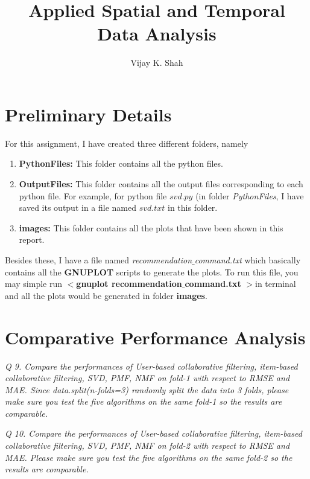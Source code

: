 \documentclass[journal,onecolumn]{IEEEtran}
\title{Applied Spatial and Temporal Data Analysis}
\author{Vijay K. Shah}
\begin{document}
\maketitle

\section{Preliminary Details}
For this assignment, I have created three different folders, namely \\
\begin{enumerate}
\item \textbf{PythonFiles:} This folder contains all the python files. \\
\item \textbf{OutputFiles:} This folder contains all the output files corresponding to each python file. For example, for python file $svd.py$ (in folder \textit{PythonFiles}, I have saved its output in  a file named $svd.txt$ in this folder. \\
\item \textbf{images:} This folder contains all the plots that have been shown in this report. \\
\end{enumerate}

Besides these, I have a file named \textit{recommendation$\_$command.txt} which basically contains all the \textbf{GNUPLOT} scripts to generate the plots. To run this file, you may simple run $<$\textbf{gnuplot recommendation$\_$command.txt} $>$in terminal and all the plots would be generated in folder \textbf{images}.


\section{Comparative Performance Analysis}

\textit{Q 9. Compare the performances of User-based collaborative filtering, item-based collaborative filtering, SVD, PMF, NMF on fold-1 with respect to RMSE and MAE. Since data.split(n-folds=3) randomly split the data into 3 folds, please make sure you test the five algorithms on the same fold-1 so the results are comparable.} 

\textit{Q 10. Compare the performances of User-based collaborative filtering, item-based collaborative
filtering, SVD, PMF, NMF on fold-2 with respect to RMSE and MAE. Please make sure you test
the five algorithms on the same fold-2 so the results are comparable. }
\end{document}
